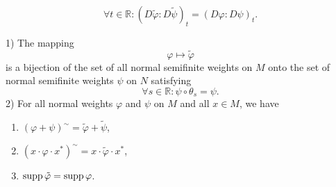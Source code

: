 \begin{equation}
    \forall t\in \mathbb{R}:(D\tilde{\varphi}:D\tilde{\psi})_t=(D\varphi:D\psi)_t.
\end{equation}
\begin{lemma}\label{Chap2: lemma: 1}
    1) The mapping
    \[
        \varphi\mapsto \tilde{\varphi}
    \]
    is a bijection of the set of all normal semifinite weights on $M$ onto the set of normal semifinite weights $\psi$ on $N$ satisfying
    \begin{equation}\label{Chap2: eqn: 13}
        \forall s\in \mathbb{R}:\psi\circ \theta_s=\psi.
    \end{equation}
    2) For all normal weights $\varphi$ and $\psi$ on $M$ and all $x\in M$, we have
    \begin{enumerate}
        \item $(\varphi+\psi)^\sim=\tilde{\varphi}+\tilde{\psi}$,
        \item $(x\cdot \varphi\cdot x^*)^\sim=x\cdot \tilde{\varphi}\cdot x^*$,
        \item $\operatorname{supp} \tilde{\varphi}=\operatorname{supp} \varphi$.
    \end{enumerate}
\end{lemma}
